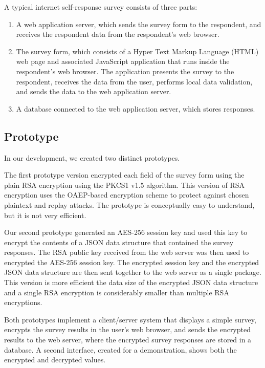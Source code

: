 \documentclass[fleqn,12pt]{wlscirep}
\begin{document}
A typical internet self-response survey consists of three parts:

\begin{enumerate}
  \item A web application server, which sends the survey form to
    the respondent, and receives the respondent data from the
    respondent's web browser.
  \item The survey form, which consists of a Hyper Text Markup
    Language (HTML) web page and associated JavaScript application
    that runs inside the respondent's web browser. The application
    presents the survey to the respondent, receives the data from the user, performs
    local data validation, and sends the data to the web application
    server.
  \item A database connected to the web application server, which stores responses.
\end{enumerate}

\subsection{Prototype}
In our development, we created two distinct prototypes.

The first prototype version encrypted each field of the survey form
using the plain RSA encryption using the PKCS1 v1.5
algorithm. This version of RSA encryption uses the OAEP-based
encryption scheme to protect against chosen plaintext and replay
attacks. The prototype is conceptually easy to understand, but it is not very efficient. 

Our second prototype generated an AES-256 session key and used this
key to encrypt the contents of a JSON data structure that contained
the survey responses. The RSA public key received from the web server
was then used to encrypted the AES-256 session key. The encrypted
session key and the encrypted JSON data structure are then sent
together to the web server as a single package. This version is more
efficient the data size of the encrypted JSON data structure and a
single RSA encryption is considerably smaller than multiple RSA encryptions.

Both prototypes implement a client/server system that displays a
simple survey, encrypts the survey results in the user's web browser,
and sends the encrypted results to the web server, where the encrypted
survey responses are stored in a database. A second interface, created
for a demonstration, shows both the encrypted and decrypted values.
\end{document}
